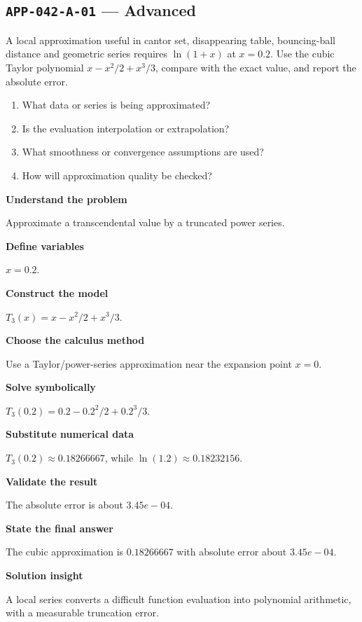\documentclass[11pt]{book}
\newcommand{\pid}[1]{\texttt{#1}}
\begin{document}
\subsection*{\pid{APP-042-A-01} — Advanced}
\begin{problembox}
A local approximation useful in cantor set, disappearing table, bouncing-ball distance and geometric series requires $\ln(1+x)$ at $x=0.2$. Use the cubic Taylor polynomial $x-x^2/2+x^3/3$, compare with the exact value, and report the absolute error.
\end{problembox}
\begin{promptbox}\begin{enumerate}
\item What data or series is being approximated?
\item Is the evaluation interpolation or extrapolation?
\item What smoothness or convergence assumptions are used?
\item How will approximation quality be checked?
\end{enumerate}\end{promptbox}
\begin{solutionbox}
\textbf{Understand the problem}\par Approximate a transcendental value by a truncated power series.\par\medskip
\textbf{Define variables}\par $x=0.2$.\par\medskip
\textbf{Construct the model}\par $T_3(x)=x-x^2/2+x^3/3$.\par\medskip
\textbf{Choose the calculus method}\par Use a Taylor/power-series approximation near the expansion point $x=0$.\par\medskip
\textbf{Solve symbolically}\par $T_3(0.2)=0.2-0.2^2/2+0.2^3/3$.\par\medskip
\textbf{Substitute numerical data}\par $T_3(0.2)\approx 0.18266667$, while $\ln(1.2)\approx 0.18232156$.\par\medskip
\textbf{Validate the result}\par The absolute error is about $3.45e-04$.\par\medskip
\textbf{State the final answer}\par The cubic approximation is $0.18266667$ with absolute error about $3.45e-04$.\par\medskip
\textbf{Solution insight}\par A local series converts a difficult function evaluation into polynomial arithmetic, with a measurable truncation error.\par\medskip
\end{solutionbox}
\end{document}
